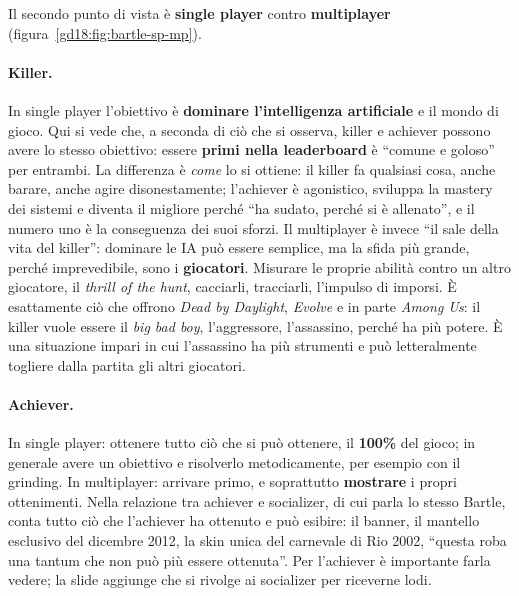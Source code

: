 Il secondo punto di vista è \textbf{single player} contro \textbf{multiplayer}
(figura~\ref{gd18:fig:bartle-sp-mp}).

\paragraph{Killer.} In single player l'obiettivo è \textbf{dominare l'intelligenza
artificiale} e il mondo di gioco. Qui si vede che, a seconda di ciò che si osserva,
killer e achiever possono avere lo stesso obiettivo: essere \textbf{primi nella
leaderboard} è ``comune e goloso'' per entrambi. La differenza è \emph{come} lo si
ottiene: il killer fa qualsiasi cosa, anche barare, anche agire disonestamente;
l'achiever è agonistico, sviluppa la mastery dei sistemi e diventa il migliore
perché ``ha sudato, perché si è allenato'', e il numero uno è la conseguenza dei suoi
sforzi. Il multiplayer è invece ``il sale della vita del killer'': dominare le IA può
essere semplice, ma la sfida più grande, perché imprevedibile, sono i
\textbf{giocatori}. Misurare le proprie abilità contro un altro giocatore, il
\emph{thrill of the hunt}, cacciarli, tracciarli, l'impulso di imporsi. È
esattamente ciò che offrono \emph{Dead by Daylight}, \emph{Evolve} e in parte
\emph{Among Us}: il killer vuole essere il \emph{big bad boy}, l'aggressore,
l'assassino, perché ha più potere. È una situazione impari in cui l'assassino ha più
strumenti e può letteralmente togliere dalla partita gli altri giocatori.

\paragraph{Achiever.} In single player: ottenere tutto ciò che si può ottenere, il
\textbf{100\%} del gioco; in generale avere un obiettivo e risolverlo metodicamente,
per esempio con il grinding. In multiplayer: arrivare primo, e soprattutto
\textbf{mostrare} i propri ottenimenti. Nella relazione tra achiever e socializer,
di cui parla lo stesso Bartle, conta tutto ciò che l'achiever ha ottenuto e può
esibire: il banner, il mantello esclusivo del dicembre 2012, la skin unica del
carnevale di Rio 2002, ``questa roba una tantum che non può più essere ottenuta''.
Per l'achiever è importante farla vedere; la slide aggiunge che si rivolge ai
socializer per riceverne lodi.

